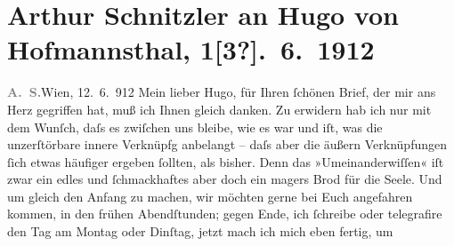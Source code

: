 

         
         \renewcommand{\erwaehntePersonen}{Personen: Hugo von Hofmannsthal}
         \renewcommand{\erwaehnteOrte}{Orte: Neues Deutsches Theater, Prag, Wien}
         \renewcommand{\erwaehnteWerke}{Werke: Der einsame Weg. Schauspiel in fünf Akten, Tagebuch}
               \section[Arthur Schnitzler an Hugo von Hofmannsthal, 1{[}3?{]}. 6. 1912]{ Arthur Schnitzler an Hugo von Hofmannsthal, 1{[}3?{]}. 6. 1912}\nopagebreak{}\rehead{ }\begin{ledgroupsized}[t]{13cm}\normalsize\beginnumbering \toendnotes[C]{\smallbreak\pagebreak[2]} 
\toendnotes[C]{\smallbreak}\pstart
           {\pb}\textcolor{gray}{\textbf{A. S.}}\hfill Wien, 12. 6. 912\pend
           \pstart
           Mein lieber Hugo, für Ihren ſchönen Brief, der mir ans Herz
               gegriffen hat, muß ich Ihnen gleich danken. Zu erwidern hab ich nur mit dem Wunſch,
               daſs es zwiſchen uns bleibe, wie es war und iſt, was die unzerſtörbare innere
               Verknüpfg anbelangt – daſs aber die äußern Verknüpfungen ſich etwas {\pb}häufiger ergeben ſollten, als bisher. Denn das
               »Umeinanderwiſſen« iſt zwar ein edles und ſchmackhaftes aber doch ein magers Brod für
               die Seele. Und um gleich den Anfang zu machen, wir möchten gerne \label{K_L02075_1v}\label{K_L02075_1h} bei Euch angefahren kommen, in den frühen Abendſtunden; gegen Ende, ich
               ſchreibe oder telegrafire den Tag \introOben{}am\introOben{} Montag oder Dinſtag,
                  {\pb}jetzt mach ich mich eben fertig, um \label{K_L02075_2v}
\end{ledgroupsized}
